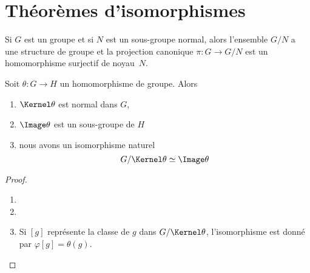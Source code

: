\section{Théorèmes d'isomorphismes}

Si \( G\) est un groupe et si \( N\) est un sous-groupe normal, alors l'ensemble \( G/N\) a une structure de groupe et la projection canonique \( \pi\colon G\to G/N\) est un homomorphisme surjectif de noyau~\( N\).

\begin{theorem}        \label{ThoPremierthoisomo}
    Soit \( \theta\colon G\to H\) un homomorphisme de groupe. Alors
    \begin{enumerate}
        \item
            \( \Kernel\theta\) est normal dans \( G\),
        \item
            \( \Image \theta\) est un sous-groupe de \( H\)
        \item   \label{ItemWLCLdk}
            nous avons un isomorphisme naturel
            \begin{equation}
                G/\Kernel\theta\simeq \Image\theta
            \end{equation}
    \end{enumerate}
\end{theorem}

\begin{proof}
    \begin{enumerate}
        \item
        \item
        \item
            Si \( [g]\) représente la classe de \( g\) dans \( G/\Kernel\theta\), l'isomorphisme est donné par \( \varphi[g]=\theta(g)\).
    \end{enumerate}
\end{proof}


